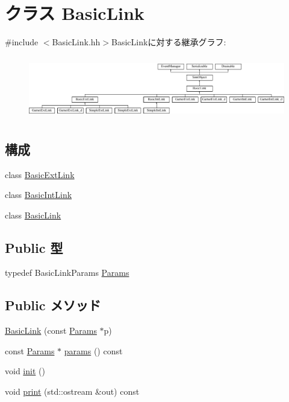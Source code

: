 \hypertarget{classBasicLink}{
\section{クラス BasicLink}
\label{classBasicLink}
}


{\ttfamily \#include $<$BasicLink.hh$>$}BasicLinkに対する継承グラフ:\begin{figure}[H]
\begin{center}
\leavevmode
\includegraphics[height=2.77778cm]{classBasicLink}
\end{center}
\end{figure}
\subsection*{構成}
\begin{DoxyCompactItemize}
\item 
class \hyperlink{classBasicLink_1_1BasicExtLink}{BasicExtLink}
\item 
class \hyperlink{classBasicLink_1_1BasicIntLink}{BasicIntLink}
\item 
class \hyperlink{classBasicLink_1_1BasicLink}{BasicLink}
\end{DoxyCompactItemize}
\subsection*{Public 型}
\begin{DoxyCompactItemize}
\item 
typedef BasicLinkParams \hyperlink{classBasicLink_a2c371814143f1675a601e935bfbd756c}{Params}
\end{DoxyCompactItemize}
\subsection*{Public メソッド}
\begin{DoxyCompactItemize}
\item 
\hyperlink{classBasicLink_af091b64081caf23401757ab96502e927}{BasicLink} (const \hyperlink{classBasicLink_a2c371814143f1675a601e935bfbd756c}{Params} $\ast$p)
\item 
const \hyperlink{classBasicLink_a2c371814143f1675a601e935bfbd756c}{Params} $\ast$ \hyperlink{classBasicLink_acd3c3feb78ae7a8f88fe0f110a718dff}{params} () const 
\item 
void \hyperlink{classBasicLink_a02fd73d861ef2e4aabb38c0c9ff82947}{init} ()
\item 
void \hyperlink{classBasicLink_ac55fe386a101fbae38c716067c9966a0}{print} (std::ostream \&out) const 
\end{DoxyCompactItemize}

